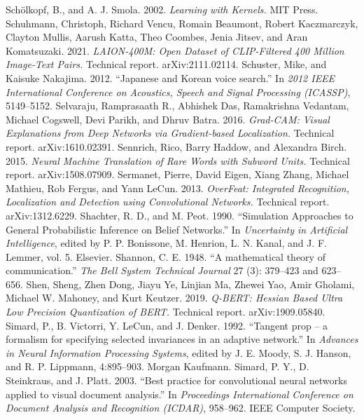  Sch\"olkopf, B., and A. J. Smola. 2002. \emph{Learning with Kernels.} MIT Press.
 Schuhmann, Christoph, Richard Vencu, Romain Beaumont, Robert Kaczmarczyk, Clayton Mullis, Aarush Katta, Theo Coombes, Jenia Jitsev, and Aran Komatsuzaki. 2021. \emph{LAION-400M: Open Dataset of CLIP-Filtered 400 Million Image-Text Pairs.} Technical report. arXiv:2111.02114.
 Schuster, Mike, and Kaisuke Nakajima. 2012. ``Japanese and Korean voice search.'' In \emph{2012 IEEE International Conference on Acoustics, Speech and Signal Processing (ICASSP)}, 5149--5152.
 Selvaraju, Ramprasaath R., Abhishek Das, Ramakrishna Vedantam, Michael Cogswell, Devi Parikh, and Dhruv Batra. 2016. \emph{Grad-CAM: Visual Explanations from Deep Networks via Gradient-based Localization.} Technical report. arXiv:1610.02391.
 Sennrich, Rico, Barry Haddow, and Alexandra Birch. 2015. \emph{Neural Machine Translation of Rare Words with Subword Units.} Technical report. arXiv:1508.07909.
 Sermanet, Pierre, David Eigen, Xiang Zhang, Michael Mathieu, Rob Fergus, and Yann LeCun. 2013. \emph{OverFeat: Integrated Recognition, Localization and Detection using Convolutional Networks.} Technical report. arXiv:1312.6229.
 Shachter, R. D., and M. Peot. 1990. ``Simulation Approaches to General Probabilistic Inference on Belief Networks.'' In \emph{Uncertainty in Artificial Intelligence}, edited by P. P. Bonissone, M. Henrion, L. N. Kanal, and J. F. Lemmer, vol. 5. Elsevier.
 Shannon, C. E. 1948. ``A mathematical theory of communication.'' \emph{The Bell System Technical Journal} 27 (3): 379--423 and 623--656.
 Shen, Sheng, Zhen Dong, Jiayu Ye, Linjian Ma, Zhewei Yao, Amir Gholami, Michael W. Mahoney, and Kurt Keutzer. 2019. \emph{Q-BERT: Hessian Based Ultra Low Precision Quantization of BERT.} Technical report. arXiv:1909.05840.
 Simard, P., B. Victorri, Y. LeCun, and J. Denker. 1992. ``Tangent prop -- a formalism for specifying selected invariances in an adaptive network.'' In \emph{Advances in Neural Information Processing Systems}, edited by J. E. Moody, S. J. Hanson, and R. P. Lippmann, 4:895--903. Morgan Kaufmann.
 Simard, P. Y., D. Steinkraus, and J. Platt. 2003. ``Best practice for convolutional neural networks applied to visual document analysis.'' In \emph{Proceedings International Conference on Document Analysis and Recognition (ICDAR)}, 958--962. IEEE Computer Society.
